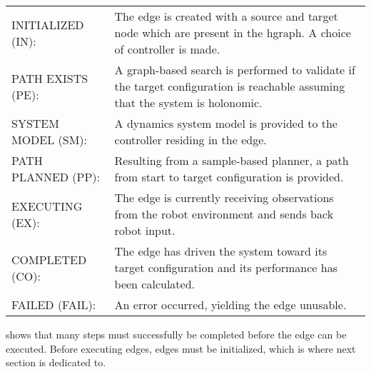 \noindent
\begin{table}[H]
\centering
\begin{tabular}%
  {>{\raggedleft\arraybackslash}p{}%
   >{\raggedright\arraybackslash}p{}}
INITIALIZED (IN): & The edge is created with a source and target node which are present in the \ac{hgraph}. A choice of controller is made. \\
PATH EXISTS (PE): & A graph-based search is performed to validate if the target configuration is reachable assuming that the system is holonomic. \\
SYSTEM MODEL (SM): & A dynamics system model is provided to the controller residing in the edge. \\
PATH PLANNED (PP): & Resulting from a sample-based planner, a path from start to target configuration is provided. \\
EXECUTING (EX): & The edge is currently receiving observations from the robot environment and sends back robot input. \\
COMPLETED (CO): & The edge has driven the system toward its target configuration and its performance has been calculated. \\
FAILED (FAIL): & An error occurred, yielding the edge unusable. \\
\end{tabular}
\end{table}

 shows that many steps must successfully be completed before the edge can be executed. 
Before executing edges, edges must be initialized, which is where next section is dedicated to.\bs

